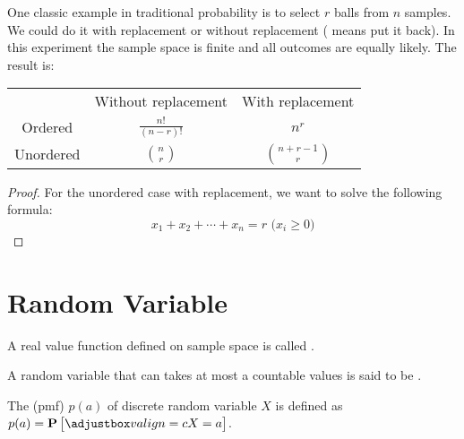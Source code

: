 \begin{example}
    One classic example in traditional probability is to select $r$ balls from $n$ samples. We could do it with replacement or without replacement ( means put it back). In this experiment the sample space is finite and all outcomes are equally likely. The result is:

\begin{table}[H]
\centering
\begin{tabular}[t]{ccc}
\hline
 & Without replacement & With replacement \\
Ordered & $\displaystyle \frac{n!}{(n-r)!}$ & $n^r$ \\ 
Unordered & $\displaystyle {n \choose r}$ & $\displaystyle {{n + r -1} \choose r}$ \\
\hline
\end{tabular}
\end{table}
\end{example}
\begin{proof}
    For the unordered case with replacement, we want to solve the following formula:
    \begin{equation}
        x_1 + x_2 + \cdots + x_n = r \text{ (} x_i \geq 0 \text{)}
    \end{equation}
\end{proof}






\section{Random Variable}

\begin{definition}
    A real value function defined on sample space is called .
\end{definition}

\begin{definition}
    A random variable that can takes at most a countable values is said to be .
\end{definition}

\begin{definition}
    The  (pmf) $p(a)$ of discrete random variable $X$ is defined as $p(a) = \probability{X = a}$.
\end{definition}


